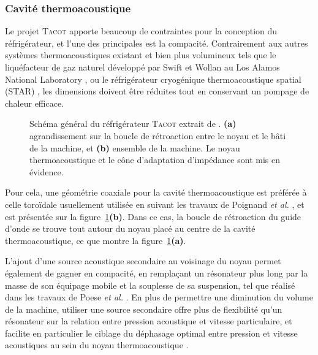 \subsubsection{Cavité thermoacoustique}
Le projet \textsc{Tacot} apporte beaucoup de contraintes pour la conception du réfrigérateur, et l'une des principales est la compacité. Contrairement aux autres systèmes thermoacoustiques existant et bien plus volumineux tels que le liquéfacteur de gaz naturel développé par Swift et Wollan au Los Alamos National Laboratory \cite{swift_thermoacoustics_2002, wollan_development_2002}, ou le réfrigérateur cryogénique thermoacoustique spatial (STAR) \cite{adeff_measurement_1991, garrett_thermoacoustic_1993}, les dimensions doivent être réduites tout en conservant un pompage de chaleur efficace. 

\begin{figure}[!ht]
    \centering
    
    \caption{Schéma général du réfrigérateur \textsc{Tacot} extrait de \cite{ramadan_design_2021}. \textbf{(a)} agrandissement sur la boucle de rétroaction entre le noyau et le bâti de la machine, et \textbf{(b)} ensemble de la machine. Le noyau thermoacoustique et le cône d'adaptation d'impédance sont mis en évidence.}
    \label{fig:SchemaGeneralTACOT}
\end{figure}

Pour cela, une géométrie coaxiale pour la cavité thermoacoustique est préférée à celle toroïdale usuellement utilisée en suivant les travaux de Poignand \textit{et al.} \cite{poignand_thermoacoustic_2011, poignand_analysis_2013}, et est présentée sur la figure~\ref{fig:SchemaGeneralTACOT}\textbf{(b)}. Dans ce cas, la boucle de rétroaction du guide d'onde se trouve tout autour du noyau placé au centre de la cavité thermoacoustique, ce que montre la figure~\ref{fig:SchemaGeneralTACOT}\textbf{(a)}.

L'ajout d'une source acoustique secondaire au voisinage du noyau permet également de gagner en compacité, en remplaçant un résonateur plus long par la masse de son équipage mobile et la souplesse de sa suspension, tel que réalisé dans les travaux de Poese \textit{et al.} \cite{poese_thermoacoustic_2004, poignand_thermoacoustic_2011, poignand_analysis_2013}. En plus de permettre une diminution du volume de la machine, utiliser une source secondaire offre plus de flexibilité qu'un résonateur sur la relation entre pression acoustique et vitesse particulaire, et facilite en particulier le ciblage du déphasage optimal entre pression et vitesse acoustiques au sein du noyau thermoacoustique \cite{poignand_thermoacoustic_2011, poignand_analysis_2013}.\smallskip

